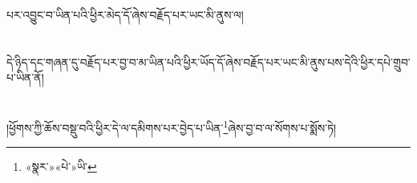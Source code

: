 པར་འབྱུང་བ་ཡིན་པའི་ཕྱིར་མེད་དོ་ཞེས་བརྗོད་པར་ཡང་མི་ནུས་ལ།\chapter{ }དེ་ཉིད་དང་གཞན་དུ་བརྗོད་པར་བྱ་བ་མ་ཡིན་པའི་ཕྱིར་ཡོད་དོ་ཞེས་བརྗོད་པར་ཡང་མི་ནུས་པས་དེའི་ཕྱིར་དཔེ་གྲུབ་པ་ཡིན་ནོ།\chapter{ }།ཕྱོགས་ཀྱི་ཆོས་བསྡུ་བའི་ཕྱིར་དེ་ལ་དམིགས་པར་བྱེད་པ་ཡིན་\footnote{«སྣར་»«པེ་»ཡི་}ཞེས་བྱ་བ་ལ་སོགས་པ་སྨོས་ཏེ།\chapt